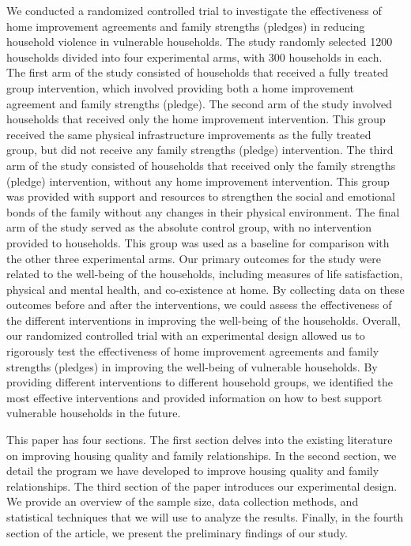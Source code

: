         We conducted a randomized controlled trial to investigate the effectiveness of home improvement agreements and family strengths (pledges) in reducing household violence in vulnerable households. The study randomly selected 1200 households divided into four experimental arms, with 300 households in each. The first arm of the study consisted of households that received a fully treated group intervention, which involved providing both a home improvement agreement and family strengths (pledge). The second arm of the study involved households that received only the home improvement intervention. This group received the same physical infrastructure improvements as the fully treated group, but did not receive any family strengths (pledge) intervention. The third arm of the study consisted of households that received only the family strengths (pledge) intervention, without any home improvement intervention. This group was provided with support and resources to strengthen the social and emotional bonds of the family without any changes in their physical environment. The final arm of the study served as the absolute control group, with no intervention provided to households. This group was used as a baseline for comparison with the other three experimental arms. Our primary outcomes for the study were related to the well-being of the households, including measures of life satisfaction, physical and mental health, and co-existence at home. By collecting data on these outcomes before and after the interventions, we could assess the effectiveness of the different interventions in improving the well-being of the households. Overall, our randomized controlled trial with an experimental design allowed us to rigorously test the effectiveness of home improvement agreements and family strengths (pledges) in improving the well-being of vulnerable households. By providing different interventions to different household groups, we identified the most effective interventions and provided information on how to best support vulnerable households in the future. 

        This paper has four sections. The first section delves into the existing literature on improving housing quality and family relationships. In the second section, we detail the program we have developed to improve housing quality and family relationships. The third section of the paper introduces our experimental design. We provide an overview of the sample size, data collection methods, and statistical techniques that we will use to analyze the results. Finally, in the fourth section of the article, we present the preliminary findings of our study. 


